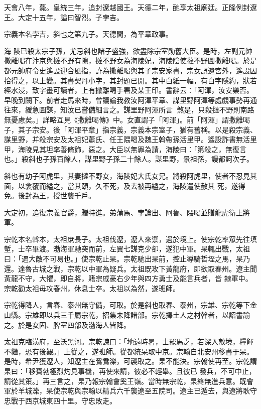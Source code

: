 \begin{pinyinscope}
 天會八年，薨。皇統三年，追封遼越國王。天德二年，酏享太祖廟廷。正隆例封遼王。大定十五年，謚曰智烈。子孛吉。



 宗義本名孛吉，斜也之第九子。天德間，為平章政事。



 海
 陵已殺太宗子孫，尤忌斜也諸子盛強，欲盡除宗室勛舊大臣。是時，左副元帥撒離喝在汴京與撻不野有隙，撻不野女為海陵妃，海陵陰使撻不野圖撒離喝。於是都元帥府令史遙設迎合風指，詐為撒離喝與其子宗安家書，宗女誤遺宮外，遙設因拾得之，以上變。其書契丹小字，其封題已開。其中白紙一幅，有白字隱約，狀若經水浸，致字畫可讀者，上有撒離喝手署及某王印。書辭云：「阿渾，汝安樂否。早晚到闕下。前者走馬來時，曾議論我教汝阿渾平章、謀里野阿渾等處覷事勢再通往來，緩急圖謀，知汝已嘗備細言之。謀里野阿渾所言
 煞是，只殺撻不野則南路無憂慮矣。」詳略互見《撒離喝傳》中。女直謂子「阿渾」。前「阿渾」謂撒離喝子，其子宗安。後「阿渾平章」指宗義，宗義本宗室子，猶有舊稱。以是殺宗義、謀里野，并殺宗安及太祖妃蕭氏、任王隈喝及魏王斡帶孫活里甲。遙設詐書無活里甲，海陵見其坦率善脩飾，惡之。大臣以無罪為請，海陵曰：「第殺之，無復言也。」殺斜也子孫百餘人，謀里野子孫二十餘人。謀里野，景祖孫，謾都訶次子。



 斜也有幼子阿虎里，其妻撻不野女，海陵妃大氏女兄。將殺阿虎里，使者不忍見其面，以衾覆而縊之，當其頤，久不死，及去被再縊之，海陵遣使赦其
 死，遂得免。後封為王，授世襲千戶。



 大定初，追復宗義官爵，贈特進。弟蒲馬、孛論出、阿魯、隈喝並贈龍虎衛上將軍。



 宗乾本名斡本，太祖庶長子。太祖伐遼，遼人來禦，遇於境上。使宗乾率眾先往填塹，士卒畢渡。渤海軍馳突而前，左翼七謀克少卻，遂犯中軍。杲輒出戰，太祖曰：「遇大敵不可易也。」使宗乾止杲。宗乾馳出杲前，控止導騎哲垤之馬，杲乃還。達魯古城之戰，宗乾以中軍為疑兵。太祖既攻下黃龍府，即欲取春州。遼主聞黃龍不守，大懼，即自將，籍宗戚豪右少年與四方勇士及能言兵者，皆
 隸軍中。宗乾勸太祖毋攻春州，休息士卒。太祖以為然，遂班師。



 宗乾得降人，言春、泰州無守備，可取。於是斜也取春、泰州，宗雄、宗乾等下金山縣。宗雄即以兵三千屬宗乾，招集未降諸部。宗乾擇土人之材幹者，以詔書諭之。於是女固、脾室四部及渤海人皆降。



 太祖克臨潢府，至沃黑河。宗乾諫曰：「地遠時暑，士罷馬乏，若深入敵境，糧餫不繼，恐有後艱。」上從之，遂班師。從都統杲取中京。宗翰自北安州移書于杲。是時，希尹獲遼人，知遼主在鴛鴦濼，可襲取之。杲不能決。宗翰使再至。宗乾謂杲曰：「移賚勃極烈灼見事機，再使來請，彼必不輕舉。且彼已
 發兵，不可中止，請從其策。」再三言之，杲乃報宗翰會奚王嶺。當時無宗乾，杲終無進兵意。既會軍於羊城濼，杲使宗乾與宗翰以精兵六千襲遼至五院司。遼主已遁去，與遼將耿守忠戰于西京城東四十里。守忠敗走。




\end{pinyinscope}
